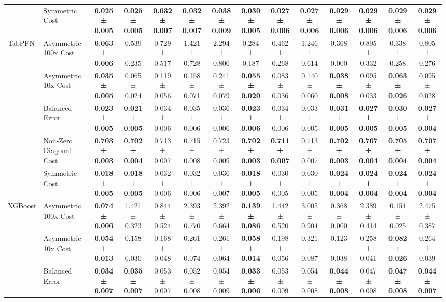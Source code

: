 \begin{table}[H]
{\begin{tabular}{llcccccccccccc}
 & Symmetric Cost & \textbf{0.025 ± 0.005} & \textbf{0.025 ± 0.005} & \textbf{0.032 ± 0.007} & \textbf{0.032 ± 0.007} & \textbf{0.038 ± 0.009} & \textbf{0.030 ± 0.005} & \textbf{0.027 ± 0.006} & \textbf{0.027 ± 0.006} & \textbf{0.029 ± 0.006} & \textbf{0.029 ± 0.006} & \textbf{0.029 ± 0.006} & \textbf{0.029 ± 0.006} \\
\cline{1-14}
\multirow[t]{5}{*}{TabPFN} & Asymmetric 100x Cost & \textbf{0.063 ± 0.006} & 0.539 ± 0.235 & 0.729 ± 0.517 & 1.421 ± 0.728 & 2.294 ± 0.806 & 0.284 ± 0.187 & 0.462 ± 0.268 & 1.246 ± 0.614 & 0.368 ± 0.000 & 0.805 ± 0.332 & 0.338 ± 0.258 & 0.805 ± 0.276 \\
 & Asymmetric 10x Cost & \textbf{0.035 ± 0.005} & 0.065 ± 0.024 & 0.119 ± 0.056 & 0.158 ± 0.071 & 0.241 ± 0.079 & \textbf{0.055 ± 0.020} & 0.083 ± 0.036 & 0.140 ± 0.060 & \textbf{0.038 ± 0.008} & 0.095 ± 0.033 & \textbf{0.063 ± 0.026} & 0.095 ± 0.028 \\
 & Balanced Error & \textbf{0.023 ± 0.005} & \textbf{0.021 ± 0.005} & 0.034 ± 0.006 & 0.035 ± 0.006 & 0.036 ± 0.006 & \textbf{0.023 ± 0.006} & 0.034 ± 0.006 & 0.033 ± 0.005 & \textbf{0.031 ± 0.005} & \textbf{0.027 ± 0.005} & \textbf{0.030 ± 0.005} & \textbf{0.027 ± 0.004} \\
 & Non-Zero Diagonal Cost & \textbf{0.703 ± 0.003} & \textbf{0.702 ± 0.004} & 0.713 ± 0.007 & 0.715 ± 0.008 & 0.723 ± 0.009 & \textbf{0.702 ± 0.003} & \textbf{0.711 ± 0.007} & 0.713 ± 0.007 & \textbf{0.702 ± 0.003} & \textbf{0.707 ± 0.004} & \textbf{0.705 ± 0.004} & \textbf{0.707 ± 0.004} \\
 & Symmetric Cost & \textbf{0.018 ± 0.005} & \textbf{0.018 ± 0.005} & 0.032 ± 0.006 & 0.032 ± 0.006 & 0.036 ± 0.007 & \textbf{0.018 ± 0.005} & 0.030 ± 0.005 & 0.030 ± 0.005 & \textbf{0.024 ± 0.004} & \textbf{0.024 ± 0.004} & \textbf{0.024 ± 0.004} & \textbf{0.024 ± 0.004} \\
\cline{1-14}
\multirow[t]{5}{*}{XGBoost} & Asymmetric 100x Cost & \textbf{0.074 ± 0.006} & 1.421 ± 0.323 & 0.844 ± 0.524 & 2.393 ± 0.770 & 2.392 ± 0.664 & \textbf{0.139 ± 0.086} & 1.442 ± 0.520 & 3.005 ± 0.904 & 0.368 ± 0.000 & 2.389 ± 0.414 & 0.154 ± 0.025 & 2.475 ± 0.387 \\
 & Asymmetric 10x Cost & \textbf{0.054 ± 0.013} & 0.158 ± 0.030 & 0.168 ± 0.048 & 0.261 ± 0.074 & 0.261 ± 0.064 & \textbf{0.058 ± 0.014} & 0.198 ± 0.056 & 0.321 ± 0.087 & 0.123 ± 0.038 & 0.258 ± 0.041 & \textbf{0.082 ± 0.026} & 0.264 ± 0.039 \\
 & Balanced Error & \textbf{0.034 ± 0.007} & \textbf{0.035 ± 0.007} & 0.053 ± 0.007 & 0.052 ± 0.008 & 0.054 ± 0.009 & \textbf{0.033 ± 0.006} & 0.053 ± 0.009 & 0.054 ± 0.008 & \textbf{0.044 ± 0.008} & 0.047 ± 0.008 & \textbf{0.047 ± 0.008} & \textbf{0.044 ± 0.007} \\

\end{tabular}}
\end{table}
